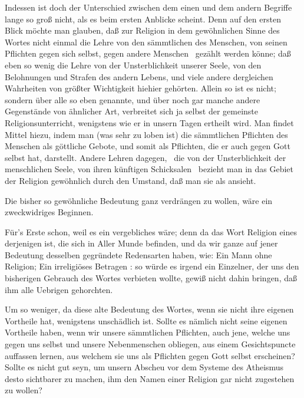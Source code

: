 \begin{aufza}
\begin{aufzb}
\end{aufzb}
\item Indessen ist doch der Unterschied zwischen dem einen und dem andern Begriffe lange so groß nicht, als es beim ersten Anblicke scheint. Denn auf den ersten Blick möchte man glauben, daß zur Religion in dem gewöhnlichen Sinne des Wortes nicht einmal die Lehre von den sämmtlichen  des Menschen, von seinen Pflichten gegen sich selbst, gegen andere Menschen \usw\ gezählt werden könne; daß eben so wenig die Lehre von der Unsterblichkeit unserer Seele, von den Belohnungen und Strafen des andern Lebens, und viele andere dergleichen Wahrheiten von größter Wichtigkeit hiehier gehörten. Allein so ist es nicht; sondern über alle so eben genannte, und über noch gar manche andere Gegenstände von ähnlicher Art, verbreitet sich ja selbst der gemeinste Religionsunterricht, wenigstens wie er in unsern Tagen ertheilt wird. Man findet Mittel hiezu, indem man (was sehr zu loben ist) die sämmtlichen Pflichten des Menschen als göttliche Gebote, und somit als Pflichten, die er auch gegen Gott selbst hat, darstellt. Andere Lehren dagegen, \zB\ die von der Unsterblichkeit der menschlichen Seele, von ihren künftigen Schicksalen \usw\ bezieht man in das Gebiet der Religion gewöhnlich durch den Umstand, daß man sie als  ansieht.
\item Die bisher so gewöhnliche Bedeutung ganz verdrängen zu wollen, wäre ein zweckwidriges Beginnen.
\begin{aufzb}
\item Für's Erste schon, weil es ein vergebliches wäre; denn da das Wort Religion eines derjenigen ist, die sich in Aller Munde befinden, und da wir ganze auf jener Bedeutung desselben gegründete Redensarten haben, wie: Ein Mann ohne Religion; Ein irreligiöses Betragen \udgl : so würde es irgend ein Einzelner, der uns den bisherigen Gebrauch des Wortes verbieten wollte, gewiß nicht dahin bringen, daß ihm alle Uebrigen gehorchten.~
\item Um so weniger, da diese alte Bedeutung des Wortes, wenn sie nicht ihre eigenen Vortheile hat, wenigstens unschädlich ist. Sollte es nämlich nicht seine eigenen Vortheile haben, wenn wir unsere sämmtlichen Pflichten, auch jene, welche uns gegen uns selbst und unsere Nebenmenschen obliegen, aus einem Gesichtspuncte auffassen lernen, aus welchem sie uns als Pflichten gegen Gott selbst erscheinen? Sollte es nicht gut seyn, um unsern Abscheu vor dem Systeme des Atheismus desto sichtbarer zu machen, ihm den Namen einer Religion gar nicht zugestehen zu wollen?

\end{aufzb}
\end{aufza}

